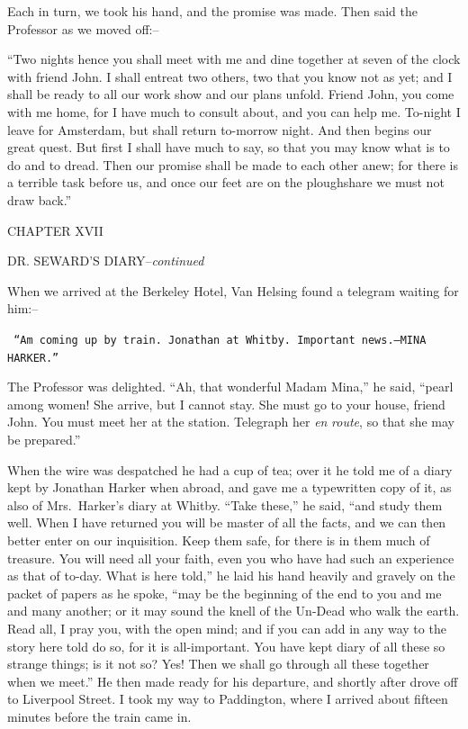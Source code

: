 \documentclass[12pt,openright]{book}
\begin{document}
Each in turn, we took his hand, and the promise was made. Then said the Professor as we moved off:–

“Two nights hence you shall meet with me and dine together at seven of the clock with friend John. I shall entreat two others, two that you know not as yet; and I shall be ready to all our work show and our plans unfold. Friend John, you come with me home, for I have much to consult about, and you can help me. To-night I leave for Amsterdam, but shall return to-morrow night. And then begins our great quest. But first I shall have much to say, so that you may know what is to do and to dread. Then our promise shall be made to each other anew; for there is a terrible task before us, and once our feet are on the ploughshare we must not draw back.”

CHAPTER XVII

DR. SEWARD’S DIARY–\textit{continued}

When we arrived at the Berkeley Hotel, Van Helsing found a telegram waiting for him:–

\texttt{ “Am coming up by train. Jonathan at Whitby. Important news.--MINA}
\texttt{ HARKER.”}

The Professor was delighted. “Ah, that wonderful Madam Mina,” he said, “pearl among women! She arrive, but I cannot stay. She must go to your house, friend John. You must meet her at the station. Telegraph her \textit{en}\textit{ }\textit{route}, so that she may be prepared.”

When the wire was despatched he had a cup of tea; over it he told me of a diary kept by Jonathan Harker when abroad, and gave me a typewritten copy of it, as also of Mrs. Harker’s diary at Whitby. “Take these,” he said, “and study them well. When I have returned you will be master of all the facts, and we can then better enter on our inquisition. Keep them safe, for there is in them much of treasure. You will need all your faith, even you who have had such an experience as that of to-day. What is here told,” he laid his hand heavily and gravely on the packet of papers as he spoke, “may be the beginning of the end to you and me and many another; or it may sound the knell of the Un-Dead who walk the earth. Read all, I pray you, with the open mind; and if you can add in any way to the story here told do so, for it is all-important. You have kept diary of all these so strange things; is it not so? Yes! Then we shall go through all these together when we meet.” He then made ready for his departure, and shortly after drove off to Liverpool Street. I took my way to Paddington, where I arrived about fifteen minutes before the train came in.
\end{document}
